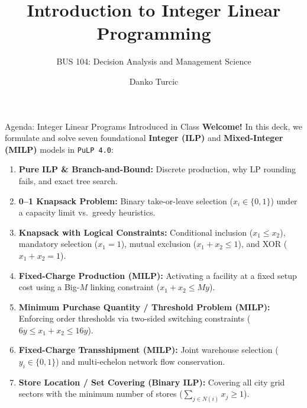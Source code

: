 \documentclass[aspectratio=169]{beamer}
\title{Introduction to Integer Linear Programming}
\subtitle{BUS 104: Decision Analysis and Management Science}
\author{Danko Turcic}
\begin{document}
\begin{frame}
  \maketitle
\end{frame}

\begin{frame}{Agenda: Integer Linear Programs Introduced in Class}
  \small
  \vspace{-0.3em}
  \textbf{Welcome!} In this deck, we formulate and solve seven foundational \textbf{Integer (ILP)} and \textbf{Mixed-Integer (MILP)} models in \texttt{PuLP 4.0}:
  \vspace{-0.2em}
  \begin{enumerate}\setlength{\itemsep}{-0.05em}
    \item \textbf{Pure ILP \& Branch-and-Bound:} Discrete production, why LP rounding fails, and exact tree search.
    \item \textbf{0--1 Knapsack Problem:} Binary take-or-leave selection ($x_i \in \{0,1\}$) under a capacity limit vs.\ greedy heuristics.
    \item \textbf{Knapsack with Logical Constraints:} Conditional inclusion ($x_1 \le x_2$), mandatory selection ($x_1 = 1$), mutual exclusion ($x_1 + x_2 \le 1$), and XOR ($x_1 + x_2 = 1$).
    \item \textbf{Fixed-Charge Production (MILP):} Activating a facility at a fixed setup cost using a Big-$M$ linking constraint ($x_1 + x_2 \le My$).
    \item \textbf{Minimum Purchase Quantity / Threshold Problem (MILP):} Enforcing order thresholds via two-sided switching constraints ($6y \le x_1 + x_2 \le 16y$).
    \item \textbf{Fixed-Charge Transshipment (MILP):} Joint warehouse selection ($y_i \in \{0,1\}$) and multi-echelon network flow conservation.
    \item \textbf{Store Location / Set Covering (Binary ILP):} Covering all city grid sectors with the minimum number of stores ($\sum_{j \in N(i)} x_j \ge 1$).
  \end{enumerate}
\end{frame}
\end{document}
